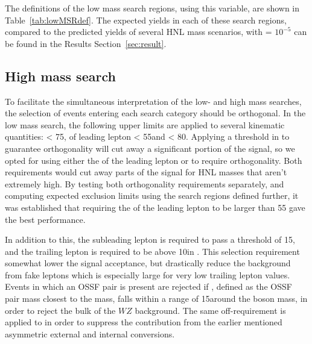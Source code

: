 The definitions of the low mass
search regions, using this variable, are shown in
Table~\ref{tab:lowMSRdef}. The expected yields in each of these search
regions, compared to the predicted yields of several HNL mass
scenarios, with \mixpar = $10^{-5}$ can be found in the Results Section~\ref{sec:result}.  

\begin{table}[tbh]
\centering
\caption{Search regions in the low mass category.}
\label{tab:lowMSRdef}
\end{table}



\subsection{High mass search}
To facilitate the simultaneous interpretation of the low- and high mass searches, the selection of events entering each search category should be orthogonal. In the low mass search, the following upper limits are applied to several kinematic quantities: 
\ptmiss < 75\GeV, \pt of leading lepton < 55\GeV and \mlll<
80\GeV. Applying a threshold in \ptmiss to guarantee orthogonality will
cut away a significant portion of the signal, so we opted for using
either the \pt of the leading lepton or \mlll to require
orthogonality. Both requirements would cut away parts of the signal
for HNL masses that aren't extremely high. By testing both
orthogonality requirements separately, and computing expected
exclusion limits using the search regions defined further,
 it was established that requiring the \pt of the leading lepton to be
 larger than 55 \GeV gave the best performance.
 
In addition to this, the subleading lepton is
 required to pass a \pt threshold of 15\GeV, and the trailing lepton
 is required to be above 10\GeV in \pt .
 This selection requirement somewhat lower the signal acceptance, but drastically
 reduce the background from fake leptons which is especially large for
 very low trailing lepton \pt values. Events in which an OSSF pair is
 present are rejected if \Mll, defined as the OSSF pair mass closest
 to the \PZ mass, falls within a range of 15\GeV around the \PZ boson
 mass, in order to reject the bulk of the $WZ$ background.
 The same off-\PZ requirement is applied to \mlll in order to suppress
 the contribution from the earlier mentioned asymmetric external and
 internal conversions.

